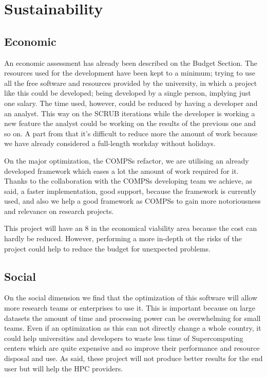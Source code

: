 \section{Sustainability}

\subsection{Economic}

An economic assessment has already been described on the Budget Section. The resources used for the development have been kept to a minimum; trying to use all the free software and resources provided by the university, in which a project like this could be developed; being developed by a single person, implying just one salary. The time used, however, could be reduced by having a developer and an analyst. This way on the SCRUB iterations while the developer is working a new feature the analyst could be working on the results of the previous one and so on. A part from that it's difficult to reduce more the amount of work because we have already considered a full-length workday without holidays.

On the major optimization, the COMPSs refactor, we are utilising an already developed framework which eases a lot the amount of work required for it. Thanks to the collaboration with the COMPSs developing team we achieve, as said, a faster implementation, good support, because the framework is currently used, and also we help a good framework as COMPSs to gain more notoriousness and relevance on research projects.

This project will have an 8 in the economical viability area because the cost can hardly be reduced. However, performing a more in-depth ot the risks of the project could help to reduce the budget for unexpected problems.



\subsection{Social}

On the social dimension we find that the optimization of this software will allow more research teams or enterprises to use it. This is important because on large datasets the amount of time and processing power can be overwhelming for small teams. Even if an optimization as this can not directly change a whole country, it could help universities and developers to waste less time of Supercomputing centers which are quite expensive and so improve their performance and resource disposal and use. As said, these project will not produce better results for the end user but will help the HPC providers.

